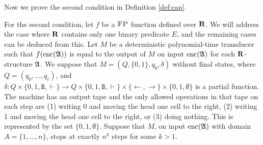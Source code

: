 \vspace{1em}
Now we prove the second condition in Definition \ref{def:cap}.

\newcommand{\ttB}{\mathtt{B}}
\newcommand{\successor}{\text{succ}}

For the second condition, let $f$ be a $\text{\sc FP}$ function defined over $\mathbf{R}$. We will address the case where $\mathbf{R}$ contains only one binary predicate $E$, and the remaining cases can be deduced from this. Let $M$ be a deterministic polynomial-time transducer such that $f({\rm enc}(\mathfrak{A}))$ is equal to the output of $M$ on input ${\rm enc}(\mathfrak{A})$ for each $\mathbf{R}$-structure $\mathfrak{A}$. We suppose that $M = (Q,\{0,1\},q_0,\delta)$ without final states, where $Q = (q_0,\ldots,q_{\ell})$, and $\delta:Q\times\{0,1,\ttB, \vdash\}\to Q\times\{0,1,\ttB, \vdash\}\times \{\leftarrow,\rightarrow\}\times\{0,1,\emptyset\}$ is a partial function. The machine has an output tape and the only allowed operations in that tape on each step are (1) writing 0 and moving the head one cell to the right, (2) writing 1 and moving the head one cell to the right, or (3) doing nothing. This is represented by the set $\{0,1,\emptyset\}$. Suppose that $M$, on input ${\rm enc}(\mathfrak{A})$ with domain $A = \{1,\dots,n\}$, stops at exactly $n^k$ steps for some $k > 1$.


